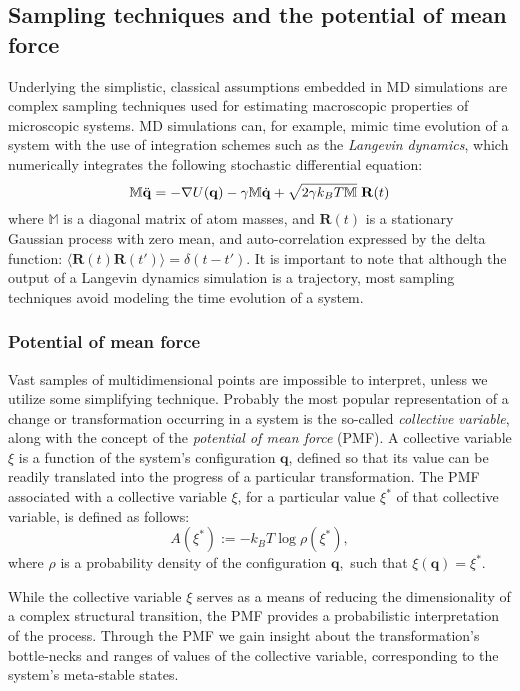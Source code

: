 \documentclass[a4paper,11pt,twoside]{book}%
\begin{document}
\subsection{Sampling techniques and the potential of mean force}

Underlying the simplistic, classical assumptions embedded in MD simulations are complex sampling techniques used for estimating macroscopic properties of microscopic systems.
MD simulations can, for example, mimic time evolution of a system with the use of integration schemes such as the \emph{Langevin dynamics}, which numerically integrates the following stochastic differential equation:
$$
 \mathbb{M}\ddot{\mathbf{q}} = -\nabla U(\mathbf{q}) -\gamma \mathbb{M}\dot{\mathbf{q}} + \sqrt{2\gamma k_BT\mathbb{M}}\hspace{0.1cm}\mathbf{R}(t)
$$
where $\mathbb{M}$ is a diagonal matrix of atom masses, and $\mathbf{R}(t)$ is a stationary Gaussian process with zero mean, and auto-correlation expressed by the delta function: $\langle \mathbf{R}(t)\mathbf{R}(t') \rangle = \delta(t-t')$. 
It is important to note that although the output of a Langevin dynamics simulation is a trajectory, most sampling techniques avoid modeling the time evolution of a system.

\subsubsection{Potential of mean force}

Vast samples of multidimensional points are impossible to interpret, unless we utilize some simplifying technique.
Probably the most popular representation of a change or transformation occurring in a system is the so-called \emph{collective variable}, along with the concept of the \emph{potential of mean force} (PMF).
A collective variable $\xi$ is a function of the system's configuration $\mathbf{q}$, defined so that its value can be readily translated into the progress of a particular transformation.
The PMF associated with a collective variable $\xi$, for a particular value $\xi^*$ of that collective variable, is defined as follows: $$ A(\xi^*):=-k_BT\log \rho (\xi^*), $$ where $\rho$ is a probability density of the configuration $\mathbf{q},$ such that $\xi(\mathbf{q})=\xi^*$.

While the collective variable $\xi$ serves as a means of reducing the dimensionality of a complex structural transition, the PMF provides a probabilistic interpretation of the process.
Through the PMF we gain insight about the transformation's bottle-necks and ranges of values of the collective variable, corresponding to the system's meta-stable states.
\end{document}
